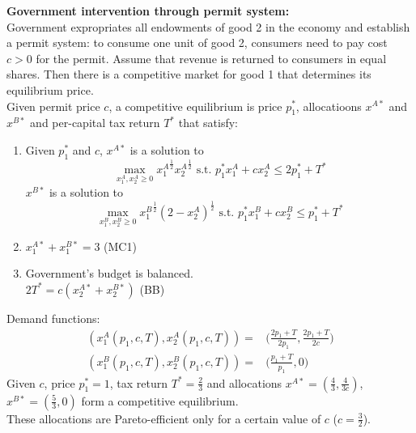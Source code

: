 \documentclass[12pt]{article}
\newcommand{\opxoa}{x^{A\ast}_1}
\newcommand{\opxta}{x^{A\ast}_2}
\newcommand{\opxob}{x^{B\ast}_1}
\newcommand{\opxtb}{x^{B\ast}_2}
\newcommand{\opxa}{x^{A\ast}}
\newcommand{\opxb}{x^{B\ast}}
\newcommand{\oppo}{p^{\ast}_1}
\begin{document}
\noindent
\textbf{Government intervention through permit system:}\\
Government expropriates all endowments of good 2 in the economy and establish a permit system: to consume one unit of good 2, consumers need to pay cost $c>0$ for the permit. Assume that revenue is returned to consumers in equal shares. Then there is a competitive market for good 1 that determines its equilibrium price.\\
Given permit price $c$, a competitive equilibrium is price $\oppo$, allocatioons $\opxa$ and $\opxb$ and per-capital tax return $T^{\ast}$ that satisfy:
\begin{enumerate}
	\item Given $\oppo$ and $c$, $\opxa$ is a solution to 
	\[ \max_{x^A_1, x^A_2 \geq 0} {x^A_1}^{\frac{1}{2}}{x^A_2}^{\frac{1}{2}} \text{ s.t. } \oppo x^A_1 + c x^{A}_2 \leq 2\oppo + T^{\ast} 
\]
 $\opxb$ is a solution to 
 \[ \max_{x^B_1, x^B_2 \geq 0} {x^B_1}^{\frac{1}{2}}{(2-x^A_2)}^{\frac{1}{2}} \text{ s.t. } \oppo x^B_1 + c x^{B}_2 \leq \oppo + T^{\ast} 
 \]
 \item $\opxoa + \opxob = 3$ (MC1)
 \item Government's budget is balanced.\\
 $2T^{\ast} = c(\opxta+\opxtb)$ (BB)
\end{enumerate}
Demand functions:\\
\begin{align*}
(x^A_1(p_1, c, T), x^A_2(p_1, c, T)) =& \big(\frac{2p_1+T}{2p_1}, \frac{2p_1+T}{2c}\big)\\
(x^B_1(p_1, c, T), x^B_2(p_1, c, T)) =& \big(\frac{p_1+T}{p_1}, 0\big)
\end{align*}
Given $c$, price $\oppo=1$, tax return $T^{\ast} = \frac{2}{3}$ and allocations $\opxa = (\frac{4}{3}, \frac{4}{3c})$, $\opxb = (\frac{5}{3}, 0)$ form a competitive equilibrium. \\
These allocations are Pareto-efficient only for a certain value of $c$ ($c=\frac{3}{2}$).
\end{document}
